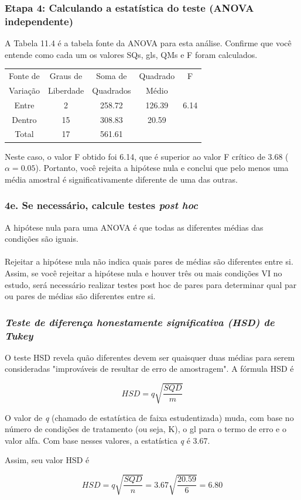 \documentclass[11pt]{beamer}
\begin{document}
\begin{frame}
\frametitle{Etapa 4: Calculando a estatística do teste (ANOVA independente)}
A Tabela 11.4 é a tabela fonte da ANOVA para esta análise. Confirme que você entende como cada um os valores SQs, gls, QMs e F foram calculados.

\begin{table}[h]
\centering
\begin{tabular}{ccccc}
\hline
Fonte de & Graus de & Soma de & Quadrado & F  \\
Variação & Liberdade & Quadrados & Médio &   \\
\hline
Entre & 2 & 258.72 & 126.39 & 6.14   \\
Dentro & 15 & 308.83 & 20.59 &   \\
\hline
Total & 17 & 561.61 &  &   \\
\hline
\end{tabular}
\end{table}

Neste caso, o valor F obtido foi 6.14, que é superior ao valor F crítico de 3.68 (\(\alpha = 0.05\)). Portanto, você rejeita a hipótese nula e conclui que pelo menos uma média amostral é significativamente diferente de uma das outras.


\end{frame}

\begin{frame}
\frametitle{4e. Se necessário, calcule testes \textit{post hoc}}
A hipótese nula para uma ANOVA é que todas as diferentes médias das condições são iguais. \\~\\

Rejeitar a hipótese nula não indica quais pares de médias são diferentes entre si. Assim, se você rejeitar a hipótese nula e houver três ou mais condições VI no estudo, será necessário realizar testes post hoc de pares para determinar qual par ou pares de médias são diferentes entre si. 

\end{frame}

\begin{frame}
\frametitle{\textit{Teste de diferença honestamente significativa (HSD) de Tukey}}

O teste HSD revela quão diferentes devem ser quaisquer duas médias para serem consideradas "improváveis de resultar de erro de amostragem". A fórmula HSD é

\[HSD = q\sqrt{\frac{SQD}{m}}\]

O valor de \textit{q} (chamado de estatística de faixa estudentizada) muda, com base no número de condições de tratamento (ou seja, K), o gl para o termo de erro e o valor alfa. Com base nesses valores, a estatística \textit{q} é 3.67.

Assim, seu valor HSD é

\[HSD = q\sqrt{\frac{SQD}{n}}= 3.67\sqrt{\frac{20.59}{6}}=6.80\]

\end{frame}
\end{document}
